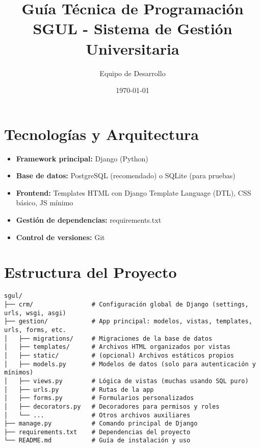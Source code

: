 \documentclass[12pt,a4paper]{article}
\title{Guía Técnica de Programación\\SGUL - Sistema de Gestión Universitaria}
\author{Equipo de Desarrollo}
\date{\today}
\begin{document}
\maketitle

\section{Tecnologías y Arquitectura}
\begin{itemize}
    \item \textbf{Framework principal:} Django (Python)
    \item \textbf{Base de datos:} PostgreSQL (recomendado) o SQLite (para pruebas)
    \item \textbf{Frontend:} Templates HTML con Django Template Language (DTL), CSS básico, JS mínimo
    \item \textbf{Gestión de dependencias:} requirements.txt
    \item \textbf{Control de versiones:} Git
\end{itemize}

\section{Estructura del Proyecto}
\begin{verbatim}
sgul/
├── crm/                # Configuración global de Django (settings, urls, wsgi, asgi)
├── gestion/            # App principal: modelos, vistas, templates, urls, forms, etc.
│   ├── migrations/     # Migraciones de la base de datos
│   ├── templates/      # Archivos HTML organizados por vistas
│   ├── static/         # (opcional) Archivos estáticos propios
│   ├── models.py       # Modelos de datos (solo para autenticación y mínimos)
│   ├── views.py        # Lógica de vistas (muchas usando SQL puro)
│   ├── urls.py         # Rutas de la app
│   ├── forms.py        # Formularios personalizados
│   ├── decorators.py   # Decoradores para permisos y roles
│   └── ...             # Otros archivos auxiliares
├── manage.py           # Comando principal de Django
├── requirements.txt    # Dependencias del proyecto
└── README.md           # Guía de instalación y uso
\end{verbatim}
\end{document}

